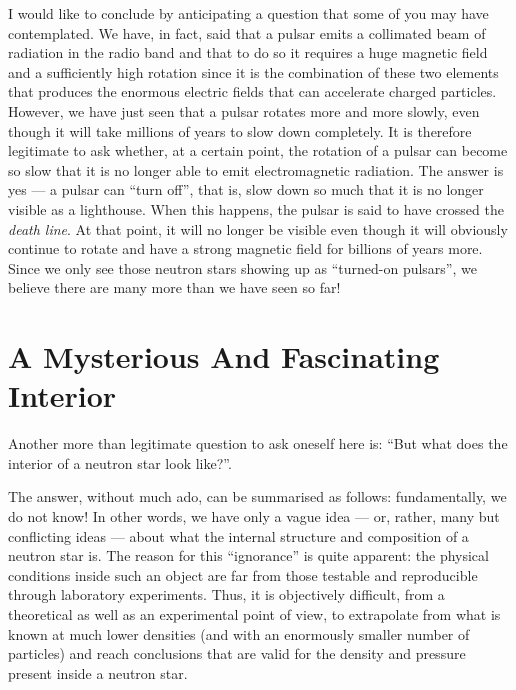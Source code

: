 I would like to conclude by anticipating a question that some of you may have
contemplated. We have, in fact, said that a pulsar emits a collimated beam of radiation
in the radio band and that to do so it requires a huge magnetic field and a sufficiently
high rotation since it is the combination of these two elements that produces the
enormous electric fields that can accelerate charged particles. However, we have just
seen that a pulsar rotates more and more slowly, even though it will take millions of
years to slow down completely. It is therefore legitimate to ask whether, at a certain
point, the rotation of a pulsar can become so slow that it is no longer able to emit
electromagnetic radiation. The answer is yes --- a pulsar can ``turn off'', that is,
slow down so much that it is no longer visible as a lighthouse. When
this happens, the pulsar is said to have crossed the \emph{death
line}. At that point, it will no longer be visible even though it will obviously
continue to rotate and have a strong magnetic field for billions of years more. Since we
only see those neutron stars showing up as ``turned-on pulsars'', we believe there are
many more than we have seen so far!

\section{A Mysterious And Fascinating Interior}\label{sec:05-interior}

Another more than legitimate question to ask oneself here is: ``But what does the
interior of a neutron star look like?''.

The answer, without much ado, can be summarised as follows: fundamentally, we do not
know! In other words, we have only a vague idea --- or, rather, many but conflicting
ideas --- about what the internal structure and composition of a neutron star is. The
reason for this ``ignorance'' is quite apparent: the physical conditions inside such an
object are far from those testable and reproducible through laboratory experiments.
Thus, it is objectively difficult, from a theoretical as well as an experimental point
of view, to extrapolate from what is known at much lower densities (and with an
enormously smaller number of particles) and reach conclusions that are valid for the
density and pressure present inside a neutron star.

